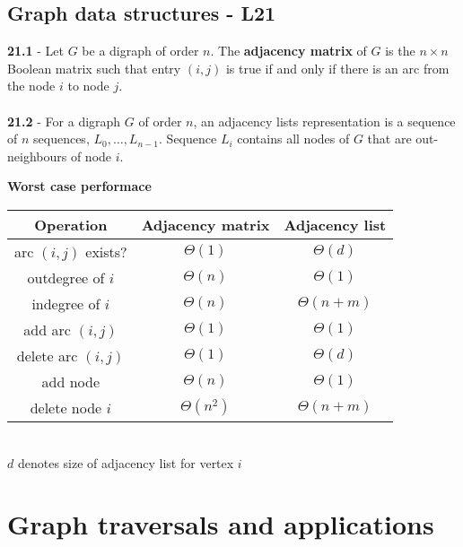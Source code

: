 \documentclass[a4paper]{article}
\begin{document}
\subsection*{Graph data structures - L21}
\textbf{21.1} - Let $G$ be a digraph of order $n$. The \textbf{adjacency matrix} of $G$ is the
$n \times n$ Boolean matrix such that entry $(i, j)$ is true if
and only if there is an arc from the node $i$ to node $j$.\\\\
\textbf{21.2} - For a digraph $G$ of order $n$, an adjacency lists representation is
a sequence of $n$ sequences, $L_0,\dots ,L_{n-1}$. Sequence $L_i$ contains all nodes of $G$ that
are out-neighbours of node $i$.
\begin{center}
    \textbf{Worst case performace}\\
    \begin{tabular}{||c c c||} 
    \hline
    Operation & Adjacency matrix & Adjacency list \\ [0.5ex] 
    \hline
    arc $(i, j)$ exists? & $\Theta(1)$ & $\Theta(d)$\\ 
    \hline
    outdegree of $i$ & $\Theta(n)$ & $\Theta(1)$\\
    \hline
    indegree of $i$ & $\Theta(n)$ & $\Theta(n+m)$ \\
    \hline
    add arc $(i,j)$ & $\Theta(1)$ & $\Theta(1)$\\
    \hline
    delete arc $(i,j)$ & $\Theta(1)$ & $\Theta(d)$  \\ 
    \hline
    add node & $\Theta(n)$ & $\Theta(1)$ \\
    \hline
    delete node $i$ & $\Theta(n^2)$ & $\Theta(n+m)$\\
    \hline
   \end{tabular}
   \\$d$ denotes size of adjacency list for vertex $i$
\end{center}


\section{Graph traversals and applications}
\end{document}
